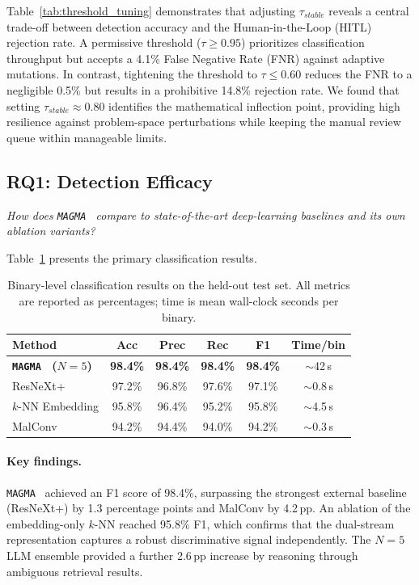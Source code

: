 \documentclass[pdflatex,sn-mathphys-num]{sn-jnl}
\newcommand{\sysname}{\texttt{MAGMA}~}
\begin{document}
Table~\ref{tab:threshold_tuning} demonstrates that adjusting $\tau_{stable}$ reveals a central trade-off between detection accuracy and the Human-in-the-Loop (HITL) rejection rate. A permissive threshold ($\tau \geq 0.95$) prioritizes classification throughput but accepts a 4.1\% False Negative Rate (FNR) against adaptive mutations. In contrast, tightening the threshold to $\tau \leq 0.60$ reduces the FNR to a negligible 0.5\% but results in a prohibitive 14.8\% rejection rate. We found that setting $\tau_{stable} \approx 0.80$ identifies the mathematical inflection point, providing high resilience against problem-space perturbations while keeping the manual review queue within manageable limits.

\subsection{RQ1: Detection Efficacy}
\label{sec:rq1}
\textit{How does \sysname{} compare to state-of-the-art deep-learning
baselines and its own ablation variants?}

Table~\ref{tab:main_results} presents the primary classification results.

\begin{table}[t]
\centering
\caption{Binary-level classification results on the held-out test set.
All metrics are reported as percentages; time is mean wall-clock
seconds per binary.}
\label{tab:main_results}
\small
\begin{tabular}{@{}lccccc@{}}
\toprule
\textbf{Method} & \textbf{Acc} & \textbf{Prec} & \textbf{Rec} & \textbf{F1} & \textbf{Time/bin} \\
\midrule
\textbf{\sysname{} ($N{=}5$)} & \textbf{98.4\%} & \textbf{98.4\%} & \textbf{98.4\%} & \textbf{98.4\%} & $\sim$42\,s \\
ResNeXt+ & 97.2\% & 96.8\% & 97.6\% & 97.1\% & $\sim$0.8\,s \\
$k$-NN Embedding & 95.8\% & 96.4\% & 95.2\% & 95.8\% & $\sim$4.5\,s \\
MalConv & 94.2\% & 94.4\% & 94.0\% & 94.2\% & $\sim$0.3\,s \\
\bottomrule
\end{tabular}
\end{table}

\paragraph{Key findings.}
\sysname{} achieved an F1 score of 98.4\%, surpassing the strongest external baseline (ResNeXt+) by 1.3 percentage points and MalConv by 4.2\,pp. An ablation of the embedding-only $k$-NN reached 95.8\% F1, which confirms that the dual-stream representation captures a robust discriminative signal independently. The $N{=}5$ LLM ensemble provided a further 2.6\,pp increase by reasoning through ambiguous retrieval results.
\end{document}
